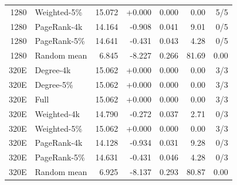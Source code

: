 \begin{table}[htbp]
\begin{tabular}{rlrrrrr}
1280 & Weighted-5\% & 15.072 & +0.000 & 0.000 & 0.00 & 5/5 \\
1280 & PageRank-4k & 14.164 & -0.908 & 0.041 & 9.01 & 0/5 \\
1280 & PageRank-5\% & 14.641 & -0.431 & 0.043 & 4.28 & 0/5 \\
1280 & Random mean & 6.845 & -8.227 & 0.266 & 81.69 & 0.00 \\
320E & Degree-4k & 15.062 & +0.000 & 0.000 & 0.00 & 3/3 \\
320E & Degree-5\% & 15.062 & +0.000 & 0.000 & 0.00 & 3/3 \\
320E & Full & 15.062 & +0.000 & 0.000 & 0.00 & 3/3 \\
320E & Weighted-4k & 14.790 & -0.272 & 0.037 & 2.71 & 0/3 \\
320E & Weighted-5\% & 15.062 & +0.000 & 0.000 & 0.00 & 3/3 \\
320E & PageRank-4k & 14.128 & -0.934 & 0.031 & 9.28 & 0/3 \\
320E & PageRank-5\% & 14.631 & -0.431 & 0.046 & 4.28 & 0/3 \\
320E & Random mean & 6.925 & -8.137 & 0.293 & 80.87 & 0.00 \\
\bottomrule
\end{tabular}
\end{table}

